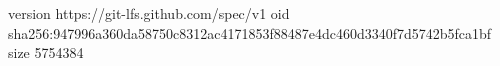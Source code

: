 version https://git-lfs.github.com/spec/v1
oid sha256:947996a360da58750c8312ac4171853f88487e4dc460d3340f7d5742b5fca1bf
size 5754384
